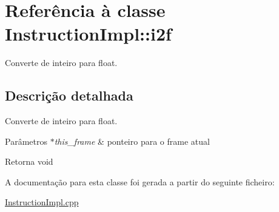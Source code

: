 \hypertarget{class_instruction_impl_1_1i2f}{}\section{Referência à classe Instruction\+Impl\+:\+:i2f}
\label{class_instruction_impl_1_1i2f}


Converte de inteiro para float.  




\subsection{Descrição detalhada}
Converte de inteiro para float. 


\begin{DoxyParams}{Parâmetros}
{\em $\ast$this\+\_\+frame} & ponteiro para o frame atual \\
\hline
\end{DoxyParams}
\begin{DoxyReturn}{Retorna}
void 
\end{DoxyReturn}


A documentação para esta classe foi gerada a partir do seguinte ficheiro\+:\begin{DoxyCompactItemize}
\item 
\hyperlink{_instruction_impl_8cpp}{Instruction\+Impl.\+cpp}\end{DoxyCompactItemize}
